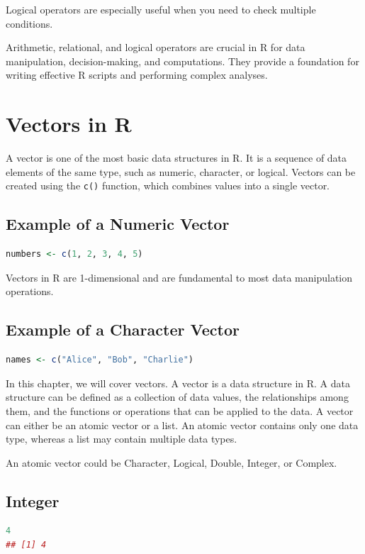 \documentclass[10pt]{book}
\begin{document}
Logical operators are especially useful when you need to check multiple conditions.


Arithmetic, relational, and logical operators are crucial in R for data manipulation, decision-making, and computations. They provide a foundation for writing effective R scripts and performing complex analyses.




\section{Vectors in R}
A vector is one of the most basic data structures in R. It is a sequence of data elements of the same type, such as numeric, character, or logical. Vectors can be created using the \texttt{c()} function, which combines values into a single vector.

\subsection{Example of a Numeric Vector}
\begin{lstlisting}[language=R]
numbers <- c(1, 2, 3, 4, 5)
\end{lstlisting}
Vectors in R are 1-dimensional and are fundamental to most data manipulation operations.

\subsection{Example of a Character Vector}
\begin{lstlisting}[language=R]
names <- c("Alice", "Bob", "Charlie")
\end{lstlisting}



In this chapter, we will cover vectors. A vector is a data structure in R. A data structure can be defined as a collection of data values, the relationships among them, and the functions or operations that can be applied to the data. A vector can either be an atomic vector or a list. An atomic vector contains only one data type, whereas a list may contain multiple data types.

An atomic vector could be Character, Logical, Double, Integer, or Complex.

\subsection{Integer}
\begin{lstlisting}[language=R]
4
## [1] 4
\end{lstlisting}
\end{document}
